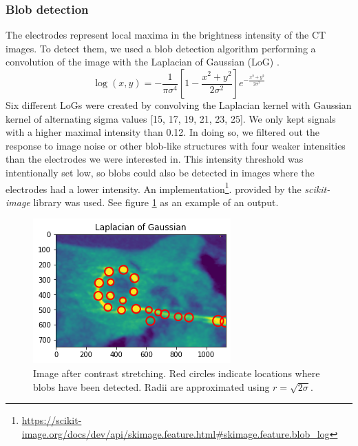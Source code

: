 \documentclass[a4paper, 10pt, twocolumn]{article}
\begin{document}
\subsubsection{Blob detection}
The electrodes represent local maxima in the brightness intensity of the CT images. To detect them, we used a blob detection algorithm performing a convolution of the image with the Laplacian of Gaussian (LoG) \cite{LoG}. 
$$
\log(x, y)=-\frac{1}{\pi \sigma^{4}}\left[1-\frac{x^{2}+y^{2}}{2 \sigma^{2}}\right] e^{-\frac{x^{2}+y^{2}}{2 \sigma^{2}}}
$$
Six different LoGs were created by convolving the Laplacian kernel with Gaussian kernel of alternating sigma values [15, 17, 19, 21, 23, 25]. We only kept signals with a higher maximal intensity than 0.12. In doing so, we filtered out the response to image noise or other blob-like structures with four weaker intensities than the electrodes we were interested in. This intensity threshold was intentionally set low, so blobs could also be detected in images where the electrodes had a lower intensity. An implementation\footnote{\url{https://scikit-image.org/docs/dev/api/skimage.feature.html#skimage.feature.blob_log}}.
provided by the \emph{scikit-image} \cite{scikit-image} library was used.
See figure \ref{blobs_detected} as an example of an output.
\begin{figure}[ht]
	\centering
  \includegraphics[width=.5\textwidth]{blobs_detected.png}
	\caption{Image after contrast stretching. Red circles indicate locations where blobs have been detected. Radii are approximated using $r=\sqrt{2 \sigma }$.}
	\label{blobs_detected}
\end{figure}
\end{document}
